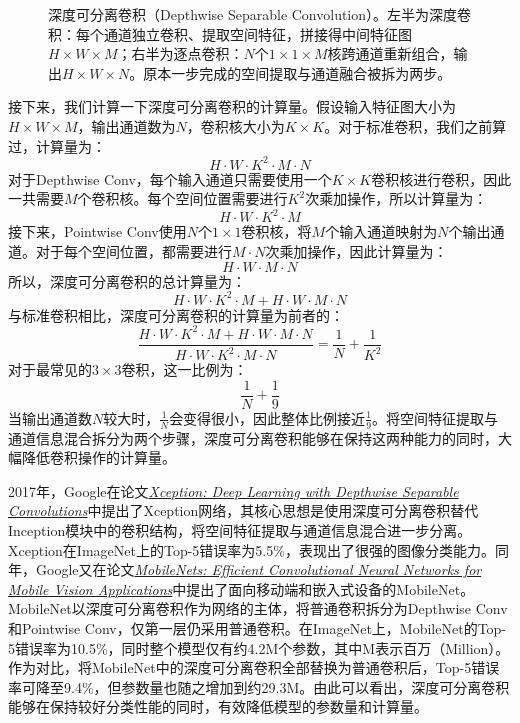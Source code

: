 \begin{figure}[H]
    \caption{深度可分离卷积（Depthwise Separable Convolution）。左半为深度卷积：每个通道独立卷积、提取空间特征，拼接得中间特征图$H\times W\times M$；右半为逐点卷积：$N$个$1\times 1\times M$核跨通道重新组合，输出$H\times W\times N$。原本一步完成的空间提取与通道融合被拆为两步。}
    \label{fig:depthwise_separable}
\end{figure}

接下来，我们计算一下深度可分离卷积的计算量。假设输入特征图大小为$H\times W\times M$，输出通道数为$N$，卷积核大小为$K\times K$。对于标准卷积，我们之前算过，计算量为：
$$
H\cdot W\cdot K^2\cdot M\cdot N
$$
对于Depthwise Conv，每个输入通道只需要使用一个$K\times K$卷积核进行卷积，因此一共需要$M$个卷积核。每个空间位置需要进行$K^2$次乘加操作，所以计算量为：
$$
H\cdot W\cdot K^2\cdot M
$$
接下来，Pointwise Conv使用$N$个$1\times1$卷积核，将$M$个输入通道映射为$N$个输出通道。对于每个空间位置，都需要进行$M\cdot N$次乘加操作，因此计算量为：
$$
H\cdot W\cdot M\cdot N
$$
所以，深度可分离卷积的总计算量为：
$$
H\cdot W\cdot K^2\cdot M+H\cdot W\cdot M\cdot N
$$
与标准卷积相比，深度可分离卷积的计算量为前者的：
$$
\frac{H\cdot W\cdot K^2\cdot M+H\cdot W\cdot M\cdot N}
{H\cdot W\cdot K^2\cdot M\cdot N}
=
\frac{1}{N}+\frac{1}{K^2}
$$
对于最常见的$3\times3$卷积，这一比例为：
$$
\frac{1}{N}+\frac{1}{9}
$$
当输出通道数$N$较大时，$\frac{1}{N}$会变得很小，因此整体比例接近$\frac{1}{9}$。将空间特征提取与通道信息混合拆分为两个步骤，深度可分离卷积能够在保持这两种能力的同时，大幅降低卷积操作的计算量。

2017年，Google在论文\href{https://openaccess.thecvf.com/content_cvpr_2017/papers/Chollet_Xception_Deep_Learning_CVPR_2017_paper.pdf}{\textit{Xception: Deep Learning with Depthwise Separable Convolutions}}中提出了Xception网络，其核心思想是使用深度可分离卷积替代Inception模块中的卷积结构，将空间特征提取与通道信息混合进一步分离。Xception在ImageNet上的Top-5错误率为5.5\%，表现出了很强的图像分类能力。同年，Google又在论文\href{https://arxiv.org/abs/1704.04861}{\textit{MobileNets: Efficient Convolutional Neural Networks for Mobile Vision Applications}}中提出了面向移动端和嵌入式设备的MobileNet。MobileNet以深度可分离卷积作为网络的主体，将普通卷积拆分为Depthwise Conv和Pointwise Conv，仅第一层仍采用普通卷积。在ImageNet上，MobileNet的Top-5错误率为10.5\%，同时整个模型仅有约4.2M个参数，其中$\mathrm{M}$表示百万（Million）。作为对比，将MobileNet中的深度可分离卷积全部替换为普通卷积后，Top-5错误率可降至9.4\%，但参数量也随之增加到约29.3M。由此可以看出，深度可分离卷积能够在保持较好分类性能的同时，有效降低模型的参数量和计算量。

